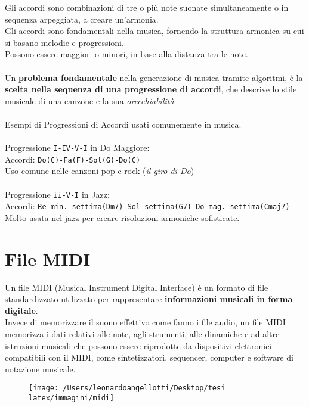 \documentclass[a4paper,12pt]{report}
\begin{document}
Gli accordi sono combinazioni di tre o più note suonate simultaneamente o in sequenza arpeggiata, a creare un'armonia. \\
Gli accordi sono fondamentali nella musica, fornendo la struttura armonica su cui si basano melodie e progressioni. \\
Possono essere maggiori o minori, in base alla distanza tra le note. \\
\\
Un \textbf{problema fondamentale} nella generazione di musica tramite algoritmi, è la \textbf{scelta nella sequenza di una progressione di accordi}, che descrive lo stile musicale di una canzone e la sua \textit{orecchiabilità}. \\
\\
Esempi di Progressioni di Accordi usati comunemente in musica.\\
\\
Progressione \texttt{I-IV-V-I} in Do Maggiore: \\
Accordi: \texttt{Do(C)-Fa(F)-Sol(G)-Do(C)} \\
Uso comune nelle canzoni pop e rock (\textit{il giro di Do}) \\
\\
Progressione \texttt{ii-V-I} in Jazz: \\
Accordi: \texttt{Re min. settima(Dm7)-Sol settima(G7)-Do mag. settima(Cmaj7)} \\
Molto usata nel jazz per creare risoluzioni armoniche sofisticate.

\section{File MIDI}

Un file MIDI (Musical Instrument Digital Interface) è un formato di file standardizzato utilizzato per rappresentare \textbf{informazioni musicali in forma digitale}. \\
Invece di memorizzare il suono effettivo come fanno i file audio, un file MIDI memorizza i dati relativi alle note, agli strumenti, alle dinamiche e ad altre istruzioni musicali che possono essere riprodotte da dispositivi elettronici compatibili con il MIDI, come sintetizzatori, sequencer, computer e software di notazione musicale.

\begin{figure}[H]
    \centering
    \texttt{[image: /Users/leonardoangellotti/Desktop/tesi latex/immagini/midi]} 
    \label{fig:immagine6}
\end{figure}
\end{document}
